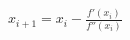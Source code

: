 \documentclass{standalone}
\begin{document}
{\tiny
$x_{i+1} = x_i - \frac{f'(x_i)}{f''(x_i)}$
}
\end{document}
